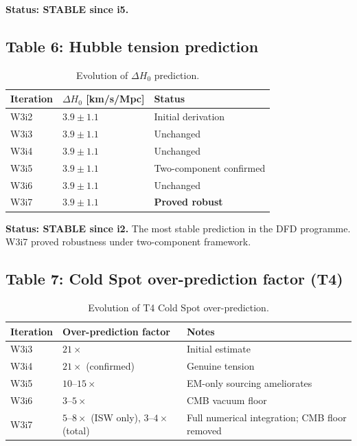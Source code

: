 \documentclass[11pt]{article}
\begin{document}
\textbf{Status: STABLE since i5.}

\subsection{Table 6: Hubble tension prediction}

\begin{table}[H]
\centering
\caption{Evolution of $\Delta H_0$ prediction.}
\label{tab:Hubble}
\begin{tabular}{lll}
\toprule
\textbf{Iteration} & $\Delta H_0$ [km/s/Mpc] & \textbf{Status} \\
\midrule
W3i2 & $3.9 \pm 1.1$ & Initial derivation \\
W3i3 & $3.9 \pm 1.1$ & Unchanged \\
W3i4 & $3.9 \pm 1.1$ & Unchanged \\
W3i5 & $3.9 \pm 1.1$ & Two-component confirmed \\
W3i6 & $3.9 \pm 1.1$ & Unchanged \\
W3i7 & $3.9 \pm 1.1$ & \textbf{Proved robust} \\
\bottomrule
\end{tabular}
\end{table}

\textbf{Status: STABLE since i2.} The most stable prediction in the DFD
programme. W3i7 proved robustness under two-component framework.

\subsection{Table 7: Cold Spot over-prediction factor (T4)}

\begin{table}[H]
\centering
\caption{Evolution of T4 Cold Spot over-prediction.}
\label{tab:T4}
\begin{tabular}{lll}
\toprule
\textbf{Iteration} & \textbf{Over-prediction factor} & \textbf{Notes} \\
\midrule
W3i3 & $21\times$ & Initial estimate \\
W3i4 & $21\times$ (confirmed) & Genuine tension \\
W3i5 & $10$--$15\times$ & EM-only sourcing ameliorates \\
W3i6 & $3$--$5\times$ & CMB vacuum floor \\
W3i7 & $5$--$8\times$ (ISW only), $3$--$4\times$ (total) &
  Full numerical integration; CMB floor removed \\
\bottomrule
\end{tabular}
\end{table}
\end{document}
